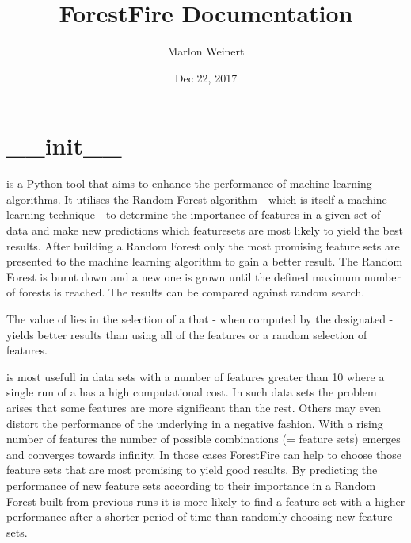 \documentclass[letterpaper,10pt,english]{sphinxmanual}
\title{ForestFire Documentation}
\date{Dec 22, 2017}
\author{Marlon Weinert}
\begin{document}
\maketitle
\sphinxtableofcontents
{}\label{\detokenize{index::doc}}



\chapter{\_\_init\_\_}
\label{\detokenize{index:init}}\label{\detokenize{index:module-ForestFire}}\label{\detokenize{index:forestfire}}
 is a Python tool that aims to enhance the performance of machine learning algorithms. 
It utilises the Random Forest algorithm - which is itself a machine learning technique - to determine the 
importance of features in a given set of data and make new predictions which featuresets are most 
likely to yield the best results. 
After building a Random Forest only the most promising feature sets are presented to the machine learning algorithm to gain a better result. 
The Random Forest is burnt down and a new one is grown until the defined maximum number of forests is reached.
The results can be compared against random search.

The value of  lies in the selection of a {\hyperref[\detokenize{Overview:term-feature-set}]{}} that - when computed by the designated {\hyperref[\detokenize{Overview:mla}]{}} - yields
better results than using all of the features or a random selection of features.

 is most usefull in data sets with a number of features greater than 10 where a single run of
a {\hyperref[\detokenize{Overview:mla}]{}} has a high computational cost. In such data sets the problem arises that some features are
more significant than the rest.
Others may even distort the performance of the underlying {\hyperref[\detokenize{Overview:mla}]{}} in a negative fashion. 
With a rising number of features the number of possible combinations (= feature sets) emerges and converges towards infinity.
In those cases ForestFire can help to choose those feature sets that are most promising to yield good results.
By predicting the performance of new feature sets according to their importance in a Random Forest built 
from previous runs it is more likely to find a feature set with a higher performance after a shorter period 
of time than randomly choosing new feature sets.
\end{document}
